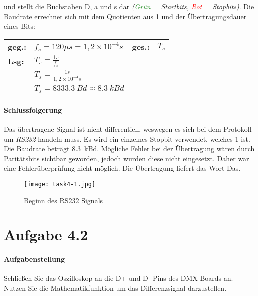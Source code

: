 \noindent und stellt die Buchstaben \glqq{}D\grqq{}, \glqq{}a\grqq{} und \glqq{}s\grqq{} dar \textit{(\textcolor{ForestGreen}{Grün} = Startbits, \textcolor{red}{Rot} = Stopbits)}. Die Baudrate errechnet sich mit dem Quotienten aus 1 und der Übertragungsdauer eines Bits:\\

\begin{tabular}{llll}
	\textbf{geg.:} & $f_s = 120 \mu s = 1,2 \times 10^{-4} s$      & \textbf{ges.:} & $T_s$ \\
	\textbf{Lsg:}  & $T_s = \frac{1s}{f_s}$                        &                &       \\
	               & $T_s = \frac{1s}{1,2 \times 10^{-4}s}$        &                &       \\
	               & $T_s = \SI{8333,3}{Bd} \approx \SI{8,3}{kBd}$ &                &
\end{tabular}

\paragraph{Schlussfolgerung}
Das übertragene Signal ist nicht differentiell, weswegen es sich bei dem Protokoll um \textit{RS232} handeln muss. Es wird ein einzelnes Stopbit verwendet, welches 1 ist. Die Baudrate beträgt \SI{8,3}{kBd}. Mögliche Fehler bei der Übertragung wären durch Paritätsbits sichtbar geworden, jedoch wurden diese nicht eingesetzt. Daher war eine Fehlerüberprüfung nicht möglich. Die Übertragung liefert das Wort \glqq{}Das\grqq{}.

\begin{figure}[!h]
	\centering
	\texttt{[image: task4-1.jpg]}
	\caption{Beginn des RS232 Signals}
	\label{task4-1-img}
\end{figure}

\section{Aufgabe 4.2}
\paragraph{Aufgabenstellung}
Schließen Sie das Oszilloskop an die D+ und D- Pins des DMX-Boards an. Nutzen Sie die Mathematikfunktion um das Differenzsignal darzustellen.


